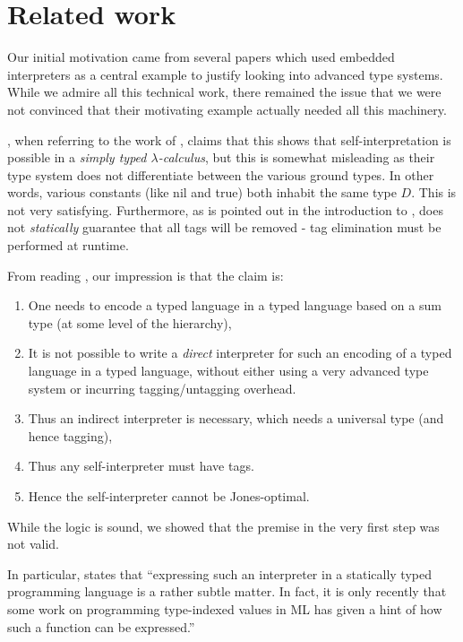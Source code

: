 \documentclass[preprint]{sigplanconf}
\begin{document}
\section{Related work}\label{related}

Our initial motivation came from several papers 
\citep{WalidICFP02,taha-tag,xi-guarded,peyton-jones-simple} which used
embedded interpreters as a central example to justify looking 
into advanced type systems.  While we admire all this technical work,
there remained the issue that we were not convinced that their 
motivating example actually needed all this machinery.

\citet{WalidICFP02}, when referring to the work of \citet{taha-tag},
claims that this shows that self-interpretation is possible in a
\emph{simply typed $\lambda$-calculus}, but this is somewhat misleading
as their type system does not differentiate between the various ground
types.  In other words, various constants (like \textsf{nil} and 
\textsf{true}) both inhabit the same type $D$.  This is not very satisfying.
Furthermore, as is pointed out in the introduction to \citet{WalidICFP02},
\citet{taha-tag} does not \emph{statically} guarantee that all tags will
be removed - tag elimination must be performed at runtime.

From reading \citet{WalidICFP02,taha-tag,xi-guarded,peyton-jones-simple}, our 
impression is that the claim is:
\begin{enumerate}
\item One needs to encode a typed language in a typed language based on
a sum type (at some level of the hierarchy),
\item It is not possible to write a \emph{direct} interpreter 
for such an encoding of a typed language
in a typed language, without either using a
very advanced type system or incurring tagging/untagging overhead.
\item Thus an indirect interpreter is necessary, which needs a universal
  type (and hence tagging),
\item Thus any self-interpreter must have tags.
\item Hence the self-interpreter cannot be Jones-optimal.
\end{enumerate}
While the logic is sound, we showed that the premise in the very first step
was not valid.

In particular, \citet[\S5]{taha-tag}
states that ``expressing such an interpreter in a statically typed
programming language is a rather subtle matter. In fact, it is only
recently that some work on programming type-indexed values in ML
\citep{yang-encoding} has given a hint of how such a function can be
expressed.''  
\end{document}
